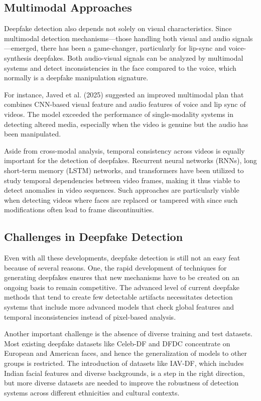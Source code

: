 \documentclass[lettersize,journal]{IEEEtran}
\begin{document}
\subsection{Multimodal Approaches} 
Deepfake detection also depends not solely on visual characteristics. Since multimodal detection mechanisms—those handling both visual and audio signals—emerged, there has been a game-changer, particularly for lip-sync and voice-synthesis deepfakes. Both audio-visual signals can be analyzed by multimodal systems and detect inconsistencies in the face compared to the voice, which normally is a deepfake manipulation signature.

For instance, Javed et al. (2025) suggested an improved multimodal plan that combines CNN-based visual feature and audio features of voice and lip sync of videos. The model exceeded the performance of single-modality systems in detecting altered media, especially when the video is genuine but the audio has been manipulated.

Aside from cross-modal analysis, temporal consistency across videos is equally important for the detection of deepfakes. Recurrent neural networks (RNNs), long short-term memory (LSTM) networks, and transformers have been utilized to study temporal dependencies between video frames, making it thus viable to detect anomalies in video sequences. Such approaches are particularly viable when detecting videos where faces are replaced or tampered with since such modifications often lead to frame discontinuities.

\subsection{Challenges in Deepfake Detection} 
Even with all these developments, deepfake detection is still not an easy feat because of several reasons. One, the rapid development of techniques for generating deepfakes ensures that new mechanisms have to be created on an ongoing basis to remain competitive. The advanced level of current deepfake methods that tend to create few detectable artifacts necessitates detection systems that include more advanced models that check global features and temporal inconsistencies instead of pixel-based analysis.

Another important challenge is the absence of diverse training and test datasets. Most existing deepfake datasets like Celeb-DF and DFDC concentrate on European and American faces, and hence the generalization of models to other groups is restricted. The introduction of datasets like IAV-DF, which includes Indian facial features and diverse backgrounds, is a step in the right direction, but more diverse datasets are needed to improve the robustness of detection systems across different ethnicities and cultural contexts.\cite{ain2024regularized}
\end{document}
